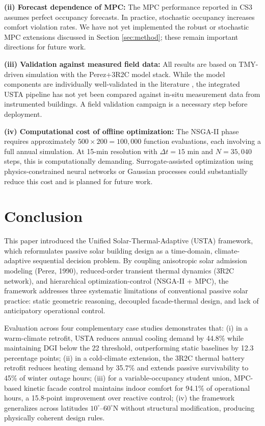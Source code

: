 \documentclass[5p,times,twocolumn]{elsarticle}
\begin{document}
\textbf{(ii) Forecast dependence of MPC:} The MPC performance reported in CS3 assumes perfect occupancy forecasts. In practice, stochastic occupancy increases comfort violation rates. We have not yet implemented the robust or stochastic MPC extensions discussed in Section \ref{sec:method}; these remain important directions for future work.

\textbf{(iii) Validation against measured field data:} All results are based on TMY-driven simulation with the Perez+3R2C model stack. While the model components are individually well-validated in the literature \cite{perez1990,yang2024,lauster2014}, the integrated USTA pipeline has not yet been compared against in-situ measurement data from instrumented buildings. A field validation campaign is a necessary step before deployment.

\textbf{(iv) Computational cost of offline optimization:} The NSGA-II phase requires approximately $500 \times 200 = 100,000$ function evaluations, each involving a full annual simulation. At 15-min resolution with $\Delta t = 15$ min and $N = 35,040$ steps, this is computationally demanding. Surrogate-assisted optimization using physics-constrained neural networks \cite{gokhale2022} or Gaussian processes could substantially reduce this cost and is planned for future work.

\section{Conclusion}
\label{sec:conclusion}

This paper introduced the Unified Solar-Thermal-Adaptive (USTA) framework, which reformulates passive solar building design as a time-domain, climate-adaptive sequential decision problem. By coupling anisotropic solar admission modeling (Perez, 1990), reduced-order transient thermal dynamics (3R2C network), and hierarchical optimization-control (NSGA-II + MPC), the framework addresses three systematic limitations of conventional passive solar practice: static geometric reasoning, decoupled facade-thermal design, and lack of anticipatory operational control.

Evaluation across four complementary case studies demonstrates that: (i) in a warm-climate retrofit, USTA reduces annual cooling demand by 44.8\% while maintaining DGI below the 22 threshold, outperforming static baselines by 12.3 percentage points; (ii) in a cold-climate extension, the 3R2C thermal battery retrofit reduces heating demand by 35.7\% and extends passive survivability to 45\% of winter outage hours; (iii) for a variable-occupancy student union, MPC-based kinetic facade control maintains indoor comfort for 94.1\% of operational hours, a 15.8-point improvement over reactive control; (iv) the framework generalizes across latitudes $10^\circ$--$60^\circ$N without structural modification, producing physically coherent design rules.
\end{document}
